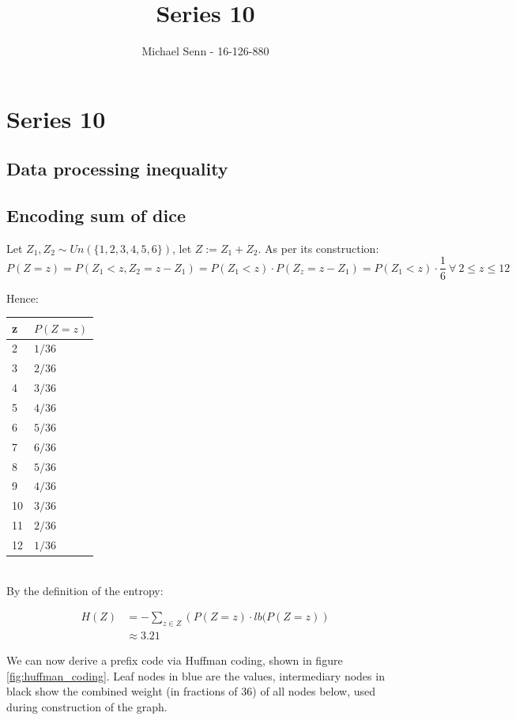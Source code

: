 \documentclass[a4paper]{scrreprt}
\title{Series 10}
\author{Michael Senn \maillink{michael.senn@students.unibe.ch} - 16-126-880}
\date{\printdate}
\begin{document}
\maketitle


\setcounter{chapter}{9}
\chapter{Series 10}

\section{Data processing inequality}

\section{Encoding sum of dice}

Let $Z_1, Z_2 \sim Un(\{1, 2, 3, 4, 5, 6\})$, let $Z := Z_1 + Z_2$. As per its
construction:
\[
	P(Z = z) = P(Z_1 < z, Z_2 = z - Z_1) = P(Z_1 < z) \cdot P(Z_z = z -Z_1) = P(Z_1 < z) \cdot \frac{1}{6}\ \forall\ 2 \leq z \leq 12
\]

Hence:
\\

\begin{tabu}{ll}
	\toprule
	z & $P(Z = z)$ \\
	  & $1 / 36$ \\
	3  & $2 / 36$ \\
	4  & $3 / 36$ \\
	5  & $4 / 36$ \\
	6  & $5 / 36$ \\
	7  & $6 / 36$ \\
	8  & $5 / 36$ \\
	9  & $4 / 36$ \\
	10 & $3 / 36$ \\
	11 & $2 / 36$ \\
	12 & $1 / 36$ \\
	\bottomrule
\end{tabu}
\\

By the definition of the entropy:

\begin{align*}
	H(Z) & = -\sum_{z \in Z}{\left(P(Z = z) \cdot lb(P(Z=z)\right)} \\
	& \approx 3.21
\end{align*}

We can now derive a prefix code via Huffman coding, shown in figure
\ref{fig:huffman_coding}. Leaf nodes in blue are the values, intermediary nodes
in black show the combined weight (in fractions of $36$) of all nodes below,
used during construction of the graph.
\end{document}
